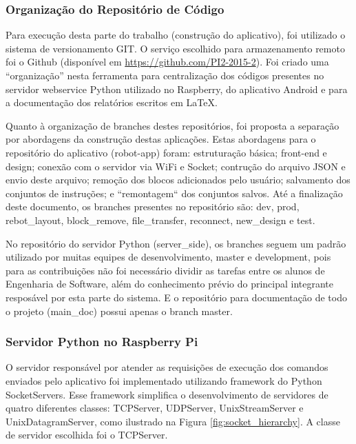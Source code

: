 \subsubsection{Organização do Repositório de Código}

Para execução desta parte do trabalho (construção do aplicativo), foi utilizado o sistema de versionamento GIT. O serviço escolhido para
armazenamento remoto foi o Github (disponível em \url{https://github.com/PI2-2015-2}). Foi criado uma “organização” nesta ferramenta para centralização
dos códigos presentes no servidor webservice Python utilizado no Raspberry, do aplicativo Android e para a documentação dos relatórios escritos em LaTeX.

Quanto à organização de branches destes repositórios, foi proposta a separação por abordagens da construção destas aplicações. Estas abordagens
para o repositório do aplicativo (robot-app) foram: estruturação básica; front-end e design; conexão com o servidor via WiFi e Socket; contrução
do arquivo JSON e envio deste arquivo; remoção dos blocos adicionados pelo usuário; salvamento dos conjuntos de instruções; e “remontagem“ dos
conjuntos salvos. Até a finalização deste documento, os branches presentes no repositório são: dev, prod, rebot\_layout, block\_remove,
file\_transfer, reconnect, new\_design e test.

No repositório do servidor Python (server\_side), os branches seguem um padrão utilizado por muitas equipes de desenvolvimento, master e
development, pois para as contribuições não foi necessário dividir as tarefas entre os alunos de Engenharia de Software, além do conhecimento
prévio do principal integrante resposável por esta parte do sistema. E o repositório para documentação de todo o projeto (main\_doc) possui apenas
o branch master.

\subsubsection{Servidor Python no Raspberry Pi}

O servidor responsável por atender as requisições de execução dos comandos enviados pelo aplicativo foi implementado utilizando framework do Python SocketServers. Esse framework simplifica o desenvolvimento de servidores de quatro diferentes classes: TCPServer, UDPServer, UnixStreamServer e UnixDatagramServer, como ilustrado na Figura \ref{fig:socket_hierarchy}. A classe de servidor escolhida foi o TCPServer. 

